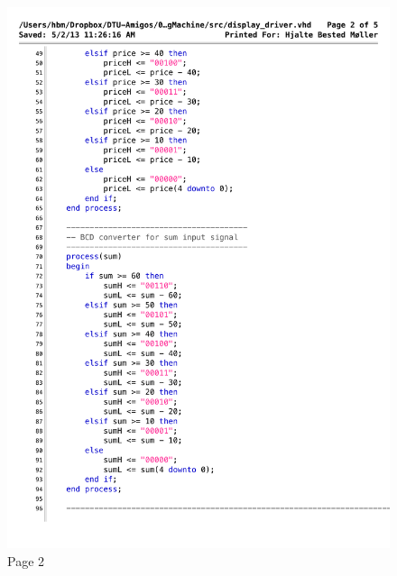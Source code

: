 \begin{figure}[!h]
\centering
\includegraphics[scale=0.7]{figs/display_driver_2.pdf}
\caption{Page 2}
\label{vhd:dispdriv2}
\end{figure}

